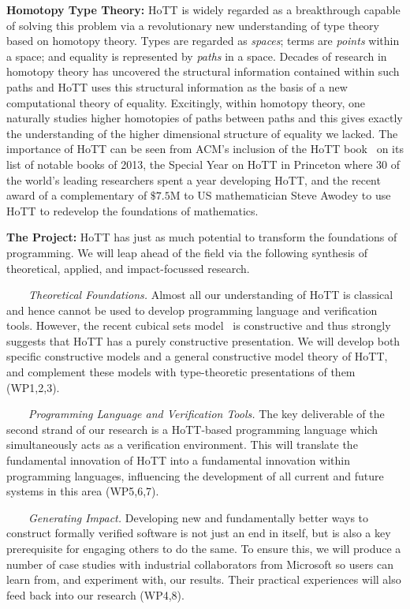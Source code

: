\documentclass[a4paper,11pt]{article}
\begin{document}
{\bf Homotopy Type Theory:} HoTT is widely regarded as a breakthrough
capable of solving this problem via a revolutionary new understanding
of type theory based on homotopy theory. Types are regarded as
\emph{spaces}; terms are \emph{points} within a space; and equality is
represented by \emph{paths} in a space. Decades of research in
homotopy theory has uncovered the structural information
contained within such paths and HoTT uses this structural
information as the basis of a new computational theory of
equality. Excitingly, within homotopy theory, one naturally studies
higher homotopies of paths between paths and this gives exactly the
understanding of the higher dimensional structure of equality we
lacked. The importance of HoTT can be seen from ACM's
inclusion of the HoTT book~\cite{hott-book} on its list of notable books
of 2013, the Special Year on HoTT in Princeton where 30 of the world's
leading researchers spent a year developing HoTT, and the recent award
of a complementary of $\$ 7.5$M to US mathematician Steve Awodey to
use HoTT to redevelop the foundations of mathematics.

{\bf The Project:} HoTT has just as much potential to
transform the foundations of programming. We will leap
ahead of the field via the following
synthesis of theoretical, applied, and impact-focussed research.

$\;\;\; \;\;\;$ {\em Theoretical Foundations.} 
Almost all our understanding of HoTT is classical and hence
cannot be used to develop programming language and verification
tools. However, the recent cubical sets model~\cite{BezemM:cubsmt,nominal} is constructive and
thus strongly suggests that HoTT has a purely constructive
presentation. We will develop both specific constructive models and a
general constructive model theory of HoTT, and complement these models
with type-theoretic presentations of them (WP1,2,3).

$\;\;\;\;\;\;$ {\em Programming Language and Verification Tools.} The key
  deliverable of the second strand of our research is a HoTT-based
  programming language which simultaneously acts as a verification
  environment. This will translate the fundamental innovation of HoTT
  into a fundamental innovation within programming languages,
  influencing the development of all current and future systems in
  this area (WP5,6,7).

  $\;\;\;\;\;\;$ {\em Generating Impact.} Developing new and
  fundamentally better ways to construct formally verified software is
  not just an end in itself, but is also a key prerequisite for
  engaging others to do the same.  To ensure this, we will produce a
  number of case studies with industrial collaborators from Microsoft so users can
  learn from, and experiment with, our results. Their practical
  experiences will also feed back into our research (WP4,8).
\end{document}
